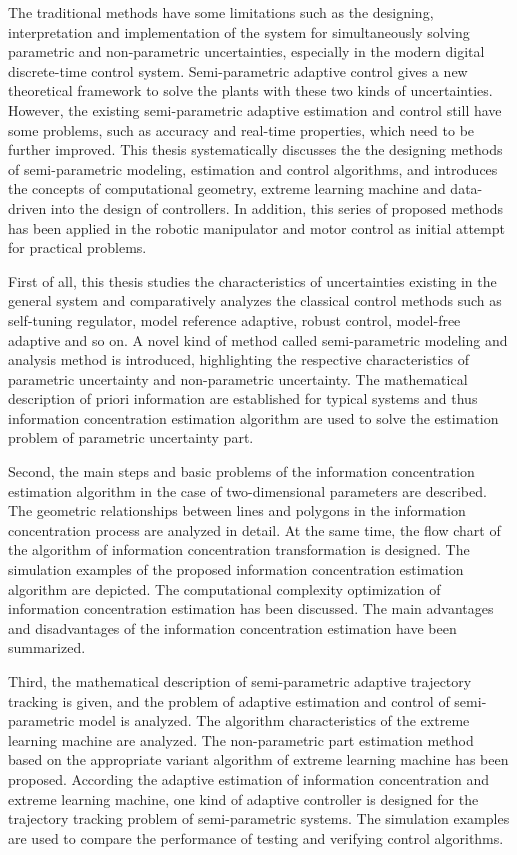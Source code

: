\begin{englishabstract}

The traditional methods have some limitations such as the designing, interpretation and implementation of the system for simultaneously solving parametric and non-parametric uncertainties, especially in the modern digital discrete-time control system. Semi-parametric adaptive control gives a new theoretical framework to solve the plants with these two kinds of uncertainties. However, the existing semi-parametric adaptive estimation and control still have some problems, such as accuracy and real-time properties, which need to be further improved. This thesis systematically discusses the  the designing methods of semi-parametric modeling, estimation and control algorithms, and introduces the concepts of computational geometry, extreme learning machine and data-driven into the design of controllers. In addition, this series of proposed methods has been applied in the robotic manipulator and motor control as initial attempt for practical problems. 

First of all, this thesis studies the characteristics of uncertainties existing in the general system and comparatively analyzes the classical control methods such as self-tuning regulator, model reference adaptive, robust control, model-free adaptive and so on. A novel kind of method called semi-parametric modeling and analysis method is introduced, highlighting the respective characteristics of parametric uncertainty and non-parametric uncertainty. The mathematical description of priori information are established for typical systems and thus information concentration estimation algorithm are used to solve the estimation problem of parametric uncertainty part.

Second, the main steps and basic problems of the information concentration estimation algorithm in the case of two-dimensional parameters are described. The geometric relationships between lines and polygons in the information concentration process are analyzed in detail. At the same time, the flow chart of the algorithm of information concentration transformation is designed. The simulation examples of the proposed information concentration estimation algorithm are depicted. The computational complexity optimization of information concentration estimation has been discussed. The main advantages and disadvantages of the information concentration estimation have been summarized.

Third, the mathematical description of semi-parametric adaptive trajectory tracking is given, and the problem of adaptive estimation and control of semi-parametric model is analyzed. The algorithm characteristics of the extreme learning machine are analyzed. The non-parametric part estimation method based on the appropriate variant algorithm of extreme learning machine has been proposed. According the adaptive estimation of information concentration and extreme learning machine, one kind of adaptive controller is designed for the trajectory tracking problem of semi-parametric systems. The simulation examples are used to compare the performance of testing and verifying control algorithms.


\end{englishabstract}
